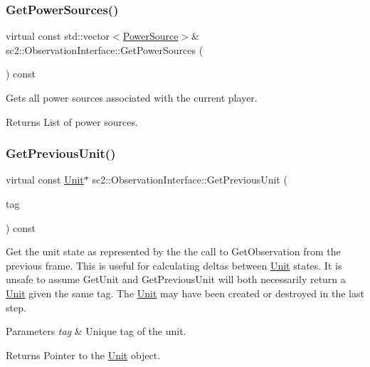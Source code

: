 \subsubsection{\texorpdfstring{Get\+Power\+Sources()}{GetPowerSources()}}
{\footnotesize\ttfamily virtual const std\+::vector$<$\hyperlink{structsc2_1_1_power_source}{Power\+Source}$>$\& sc2\+::\+Observation\+Interface\+::\+Get\+Power\+Sources (\begin{DoxyParamCaption}{ }\end{DoxyParamCaption}) const\hspace{0.3cm}{\ttfamily [pure virtual]}}

Gets all power sources associated with the current player. \begin{DoxyReturn}{Returns}
List of power sources. 
\end{DoxyReturn}
\mbox{\label{classsc2_1_1_observation_interface_a59684d8b385941931e6175800eb4bbdb}} 
\subsubsection{\texorpdfstring{Get\+Previous\+Unit()}{GetPreviousUnit()}}
{\footnotesize\ttfamily virtual const \hyperlink{classsc2_1_1_unit}{Unit}$\ast$ sc2\+::\+Observation\+Interface\+::\+Get\+Previous\+Unit (\begin{DoxyParamCaption}\item[{Tag}]{tag }\end{DoxyParamCaption}) const\hspace{0.3cm}{\ttfamily [pure virtual]}}

Get the unit state as represented by the the call to Get\+Observation from the previous frame. This is useful for calculating deltas between \hyperlink{classsc2_1_1_unit}{Unit} states. It is unsafe to assume Get\+Unit and Get\+Previous\+Unit will both necessarily return a \hyperlink{classsc2_1_1_unit}{Unit} given the same tag. The \hyperlink{classsc2_1_1_unit}{Unit} may have been created or destroyed in the last step. 
\begin{DoxyParams}{Parameters}
{\em tag} & Unique tag of the unit. \\
\hline
\end{DoxyParams}
\begin{DoxyReturn}{Returns}
Pointer to the \hyperlink{classsc2_1_1_unit}{Unit} object. 
\end{DoxyReturn}
\mbox{\label{classsc2_1_1_observation_interface_aa247d650d50d3d1bfe81642df96b1360}} 
